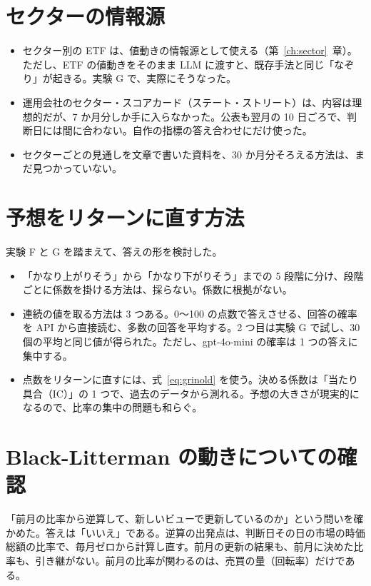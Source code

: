 \documentclass[xelatex,ja=standard,jafont=hiragino-pron,a4paper,10pt]{bxjsreport}
\newcommand{\chapref}[1]{第~\ref{#1}~章}
\begin{document}
\section{セクターの情報源}

\begin{itemize}
\item セクター別の ETF は、値動きの情報源として使える（\chapref{ch:sector}）。ただし、ETF の値動きをそのまま LLM に渡すと、既存手法と同じ「なぞり」が起きる。実験 G で、実際にそうなった。
\item 運用会社のセクター・スコアカード（ステート・ストリート）は、内容は理想的だが、7 か月分しか手に入らなかった。公表も翌月の 10 日ごろで、判断日には間に合わない。自作の指標の答え合わせにだけ使った。
\item セクターごとの見通しを文章で書いた資料を、30 か月分そろえる方法は、まだ見つかっていない。
\end{itemize}

\section{予想をリターンに直す方法}

実験 F と G を踏まえて、答えの形を検討した。

\begin{itemize}
\item 「かなり上がりそう」から「かなり下がりそう」までの 5 段階に分け、段階ごとに係数を掛ける方法は、採らない。係数に根拠がない。
\item 連続の値を取る方法は 3 つある。0〜100 の点数で答えさせる、回答の確率を API から直接読む、多数の回答を平均する。2 つ目は実験 G で試し、30 個の平均と同じ値が得られた。ただし、gpt-4o-mini の確率は 1 つの答えに集中する。
\item 点数をリターンに直すには、式~\eqref{eq:grinold} を使う。決める係数は「当たり具合（IC）」の 1 つで、過去のデータから測れる。予想の大きさが現実的になるので、比率の集中の問題も和らぐ。
\end{itemize}

\section{Black-Litterman の動きについての確認}

「前月の比率から逆算して、新しいビューで更新しているのか」という問いを確かめた。答えは「いいえ」である。逆算の出発点は、判断日その日の市場の時価総額の比率で、毎月ゼロから計算し直す。前月の更新の結果も、前月に決めた比率も、引き継がない。前月の比率が関わるのは、売買の量（回転率）だけである。
\end{document}
